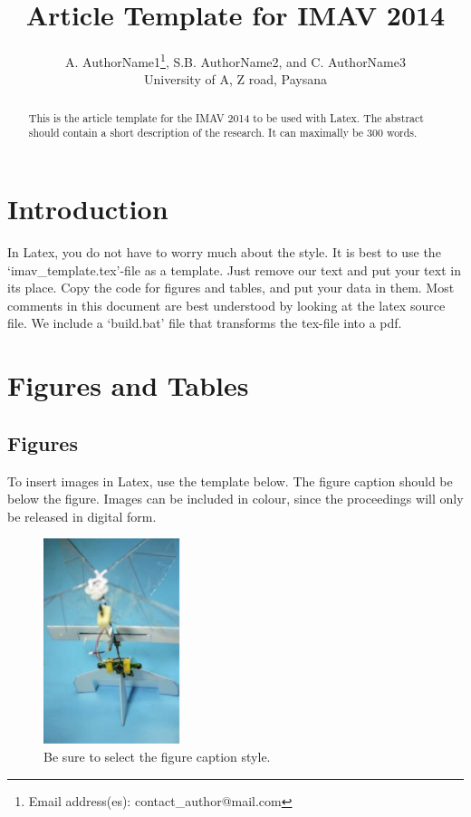 \documentclass{article}
\title{Article Template for IMAV 2014}
\author{A. AuthorName1\thanks{Email address(es): contact\_author@mail.com}, S.B. AuthorName2, and C. AuthorName3 \\ University of A, Z road, Paysana}
\begin{document}
\maketitle

\begin{abstract}
This is the article template for the IMAV 2014 to be used with Latex. The abstract should contain a short description of the research. It can maximally be 300 words.
\end{abstract}

\section{Introduction} \label{section:introduction}
In Latex, you do not have to worry much about the style. It is best to use the `imav\_template.tex'-file as a template. Just remove our text and put your text in its place. Copy the code for figures and tables, and put your data in them. Most comments in this document are best understood by looking at the latex source file. We include a `build.bat' file that transforms the tex-file into a pdf. 

\section{Figures and Tables}
\subsection{Figures}
To insert images in Latex, use the template below. The figure caption should be below the figure. Images can be included in colour, since the proceedings will only be released in digital form. 

\begin{figure}[hbt]
\centering
\includegraphics[width=4cm]{DelFlyExplorer.eps}
\caption{Be sure to select the figure caption style.}
\label{figure:DelFly_Explorer}
\end{figure}
\end{document}
